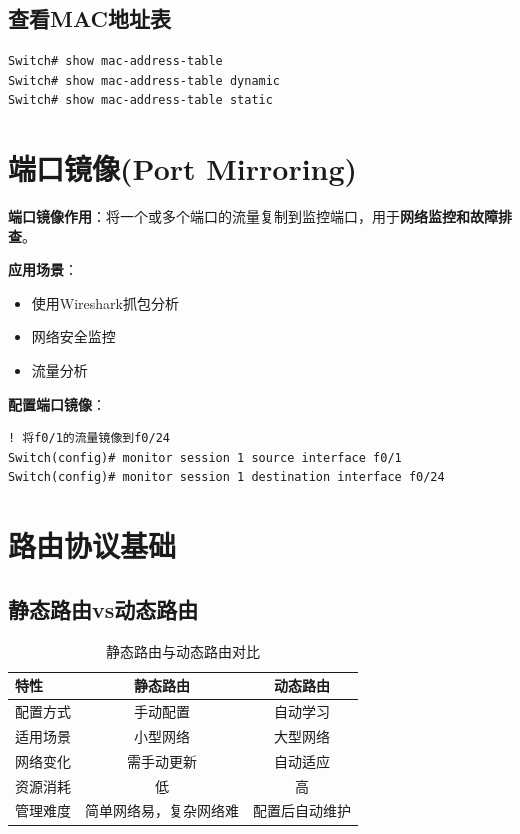 \documentclass[12pt,a4paper]{ctexart}
\begin{document}
\subsection{查看MAC地址表}

\begin{cmdbox}
\begin{lstlisting}
Switch# show mac-address-table
Switch# show mac-address-table dynamic
Switch# show mac-address-table static
\end{lstlisting}
\end{cmdbox}

\section{端口镜像(Port Mirroring)}

\begin{keybox}
\textbf{端口镜像作用}：将一个或多个端口的流量复制到监控端口，用于\textbf{网络监控和故障排查}。

\textbf{应用场景}：
\begin{itemize}[itemsep=0pt]
    \item 使用Wireshark抓包分析
    \item 网络安全监控
    \item 流量分析
\end{itemize}
\end{keybox}

\begin{cmdbox}
\textbf{配置端口镜像}：
\begin{lstlisting}
! 将f0/1的流量镜像到f0/24
Switch(config)# monitor session 1 source interface f0/1
Switch(config)# monitor session 1 destination interface f0/24
\end{lstlisting}
\end{cmdbox}

\section{路由协议基础}

\subsection{静态路由vs动态路由}

\begin{table}[htbp]
\centering
\begin{tabular}{lcc}
\toprule
\textbf{特性} & \textbf{静态路由} & \textbf{动态路由} \\
\midrule
配置方式 & 手动配置 & 自动学习 \\
适用场景 & 小型网络 & 大型网络 \\
网络变化 & 需手动更新 & 自动适应 \\
资源消耗 & 低 & 高 \\
管理难度 & 简单网络易，复杂网络难 & 配置后自动维护 \\
\bottomrule
\end{tabular}
\caption{静态路由与动态路由对比}
\end{table}
\end{document}
